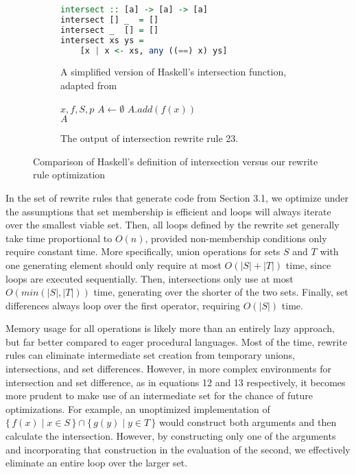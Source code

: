 \documentclass{article}
\newcommand{\Set}[2]{%
  \{\, #1 \mid #2 \, \}%
}
\begin{document}
\begin{figure}
  \centering
  \begin{subfigure}[T]{.4\textwidth}
    \centering
    \begin{lstlisting}[language=Haskell,basicstyle=\small]
intersect :: [a] -> [a] -> [a]
intersect [] _  = []
intersect _  [] = []
intersect xs ys =
    [x | x <- xs, any ((==) x) ys]
    \end{lstlisting}
    \caption{A simplified version of Haskell's intersection function, adapted from \cite{haskellIntersect}}
  \end{subfigure}
  \hfill
  \begin{subfigure}[T]{.4\textwidth}
    \centering
    \begin{algorithmic}
      \Require $x,f,S,p$
      \State $A \gets \emptyset$
          \State $A.add(f(x))$
        \EndIf
      \EndFor\\
      \Return $A$
    \end{algorithmic}
    \caption{The output of intersection rewrite rule 23.}
  \end{subfigure}
  \caption{Comparison of Haskell's definition of intersection versus our rewrite rule optimization}
  \label{fig:intersectComparison}
\end{figure}

In the set of rewrite rules that generate code from Section 3.1, we optimize under the assumptions that set membership is efficient and loops will always iterate over the smallest viable set. Then, all loops defined by the rewrite set generally take time proportional to $O(n)$, provided non-membership conditions only require constant time. More specifically, union operations for sets $S$ and $T$ with one generating element should only require at most $O(|S| + |T|)$ time, since loops are executed sequentially. Then, intersections only use at most $O(min(|S|,|T|))$ time, generating over the shorter of the two sets. Finally, set differences always loop over the first operator, requiring $O(|S|)$ time.

Memory usage for all operations is likely more than an entirely lazy approach, but far better compared to eager procedural languages. Most of the time, rewrite rules can eliminate intermediate set creation from temporary unions, intersections, and set differences. However, in more complex environments for intersection and set difference, as in equations 12 and 13 respectively, it becomes more prudent to make use of an intermediate set for the chance of future optimizations. For example, an unoptimized implementation of $\Set{f(x)}{x \in S} \cap \Set{g(y)}{y \in T}$ would construct both arguments and then calculate the intersection. However, by constructing only one of the arguments and incorporating that construction in the evaluation of the second, we effectively eliminate an entire loop over the larger set.
\end{document}
